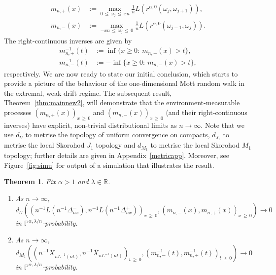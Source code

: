 \documentclass[10pt]{amsart}
\newtheorem{theo}{Theorem}[section]
\theoremstyle{definition}\newtheorem{defi}[theo]{Definition}\newtheorem{rema}[theo]{Remark}\newtheorem{exam}[theo]{Example}\newtheorem{exem}[theo]{Example}\newtheorem{nota}[theo]{Notation}
\newcommand{\R}{\mathbb R}
\renewcommand{\P}{\mathbb P}
\newcommand*{\alphenumi}{\renewcommand*{\theenumi}{\alph{enumi}}}
\begin{document}
\begin{align}
m_{n,+}(x)&:=\max_{0\,\le\,\omega_j\,\le\,xn} \frac{1}{n}L\left(r^{\alpha,0}\left(\omega_j,\omega_{j+1}\right)\right),\label{mnp}
\\
m_{n,-}(x)&:=\max_{-xn\,\leq\,\omega_j\,\le\,0} \frac{1}{n}L\left(r^{\alpha,0}\left(\omega_{j-1},\omega_{j}\right)\right).\label{mnn}
\end{align}
The right-continuous inverses are given by
\begin{align}
m^{-1}_{n,+}(t)&:=\inf\{x\geq 0:\:m_{n,+}(x)>t\},\label{mnpinv}
\\
m^{-1}_{n,-}(t)&:=-\inf\{x\geq 0:\:m_{n,-}(x)>t\},\label{mnninv}
\end{align}
respectively. We are now ready to state our initial conclusion, which starts to provide a picture of the behaviour of the one-dimensional Mott random walk in the extremal, weak drift regime. The subsequent result, Theorem~\ref{thm:mainnew2}, will demonstrate that the environment-measurable processes $(m_{n,+}(x))_{x\,\geq\,0}$ and $(m_{n,-}(x))_{x\,\geq\,0}$ (and their right-continuous inverses) have explicit, non-trivial distributional limits as $n\rightarrow\infty$. Note that we use $d_U$ to metrise the topology of uniform convergence on compacts, $d_{J_1}$ to metrise the local Skorohod $J_1$ topology and $d_{M_1}$ to metrise the local Skorohod $M_1$ topology; further details are given in Appendix~\ref{metricapp}. Moreover, see Figure~\ref{fig:simu} for output of a simulation that illustrates the result.


\begin{theo}\label{thm:mainnew1}
Fix $\alpha>1$ and $\lambda\in\R$.
\begin{enumerate}\alphenumi
\item\label{theo1.1.a} As $n\rightarrow\infty$,
\[
d_{U}\left(\left(n^{-1}L\left(n^{-1}\Delta^-_{nx}\right),n^{-1}L\left(n^{-1}\Delta^+_{nx}\right)\right)_{x\,\geq\,0},\left(m_{n,-}(x),m_{n,+}(x)\right)_{x\,\geq\,0}\right)\rightarrow 0
\]
in $\P^{\alpha,\lambda/n}$-probability.
\item\label{theo1.1.b} As $n\rightarrow\infty$,
\[
d_{M_1}\left(\left(n^{-1}\underline{X}_{nL^{-1}(n t)},n^{-1}\overline{X}_{nL^{-1}(n t)}\right)_{t\,\geq\,0},\left(m_{n,-}^{-1}(t),m_{n,+}^{-1}(t)\right)_{t\,\geq\,0}\right)\rightarrow 0
\]
in $\P^{\alpha,\lambda/n}$-probability.
\end{enumerate}
\end{theo}
\end{document}
